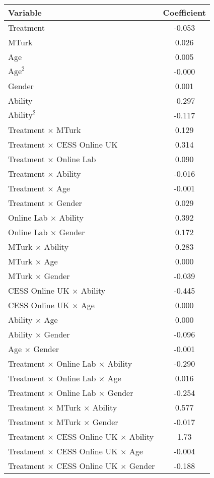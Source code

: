 \begin{table}
\centering
\begin{tabular}{lc}
\hline
Variable & Coefficient \\
\hline
Treatment & -0.053 \\
MTurk & 0.026 \\
Age & 0.005 \\
$\text{Age}^2$ & -0.000 \\
Gender & 0.001 \\
Ability & -0.297 \\
$\text{Ability}^2$ & -0.117 \\
Treatment $\times$ MTurk & 0.129 \\
Treatment $\times$ CESS Online UK & 0.314 \\
Treatment $\times$ Online Lab & 0.090 \\
Treatment $\times$ Ability & -0.016 \\
Treatment $\times$ Age & -0.001 \\
Treatment $\times$ Gender & 0.029 \\
Online Lab $\times$ Ability & 0.392 \\
Online Lab $\times$ Gender & 0.172 \\
MTurk $\times$ Ability & 0.283 \\
MTurk $\times$ Age & 0.000 \\
MTurk $\times$ Gender & -0.039 \\
CESS Online UK $\times$ Ability & -0.445 \\
CESS Online UK $\times$ Age & 0.000 \\
Ability $\times$ Age & 0.000 \\
Ability $\times$ Gender & -0.096 \\
Age $\times$ Gender & -0.001 \\
Treatment $\times$ Online Lab $\times$ Ability & -0.290 \\
Treatment $\times$ Online Lab $\times$ Age & 0.016 \\
Treatment $\times$ Online Lab $\times$ Gender & -0.254 \\
Treatment $\times$ MTurk $\times$ Ability & 0.577 \\
Treatment $\times$ MTurk $\times$ Gender & -0.017 \\
Treatment $\times$ CESS Online UK $\times$ Ability & 1.73 \\
Treatment $\times$ CESS Online UK $\times$ Age & -0.004 \\
Treatment $\times$ CESS Online UK $\times$ Gender & -0.188 \\

\end{tabular}
\end{table}
